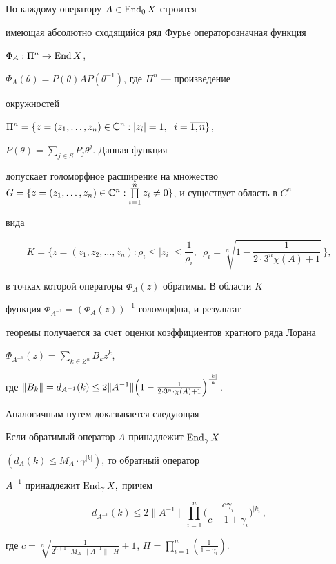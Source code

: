 \begin{pf} По каждому оператору $A\in \operatorname{End}_0 X$ строится


имеющая абсолютно сходящийся ряд Фурье операторозначная функция


$\Phi_A :\Pi^n\to \operatorname{End} X$,


$\Phi_A(\theta)=P(\theta)AP(\theta^{-1})$, где $\Pi^n$ --- произведение


окружностей


$\Pi^n=\{z=(z_1,\dotsc,z_n)\in \Bbb C^n:|z_i|=1, \ \; i=\overline{1,n}\}$,


$P(\theta)=\sum\limits_{j\in S}P_j\theta^j $. Данная функция


допускает голоморфное расширение на множество $G=\{z=(z_1,\dotsc,z_n)\in


\Bbb C^n:\prod\limits_{i=1}^nz_i\ne 0\}$, и существует область в $C^n$


вида


$$


K=\biggl\{z=(z_1,z_2,\dotsc,z_n):\rho_i\le|z_i|\le \frac{1}{\rho_i}, \ \;


\rho_i=\sqrt[n]{1-\frac{1}{2\cdot 3^n\chi(A)+1}}\,\biggr\},


$$


в точках которой операторы $\Phi_A(z)$ обратимы. В области $K$


функция $\Phi_{A^{-1}}=(\Phi_A(z))^{-1}$ голоморфна, и результат


теоремы получается за счет оценки коэффициентов кратного ряда Лорана


$\Phi_{A^{-1}}(z)=\sum\limits_{k\in Z^n}B_kz^k$,


где $\|B_k\|=d_{A^{-1}}(k)\le 2\|A^{-1}\|\Bigl(1-


\frac{1}{2\cdot 3^n\cdot \chi(A)+1}\Bigr)^{\frac{|k|}{n}}$.


\end{pf}





Аналогичным путем доказывается следующая





\begin{thm} Если обратимый оператор $A$ принадлежит $\operatorname{End}_\gamma X$


$(d_A (k)\le M_A\cdot \gamma^{|k|})$,  то обратный оператор


$A^{-1}$ принадлежит $\operatorname{End}_\gamma X,$ причем


$$


d_{A^{-1}} (k)\le 2\|A^{-1}\|\prod_{i=1}^n\biggl(


\frac {c\gamma_i}{c-1+\gamma_i}\biggr)^{|k_i|},


$$


где $c=\sqrt[n]{\frac{1}{2^{n+1}\cdot M_A \cdot


\|A^{-1}\|\cdot H}+1}$, $H=\prod\limits_{i=1}^n\left(


\frac {1}{1-\gamma_i}\right)$.


\end{thm}





